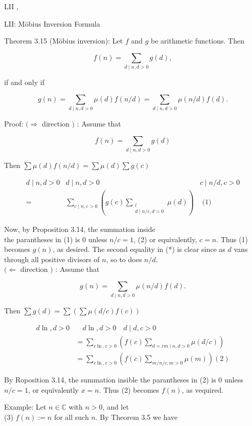 \documentclass[10pt]{article}
\begin{document}
LII ,

LII: Möbius Inversion Formula

Theorem 3.15 (Möbius inversion): Let $f$ and $g$ be arithmetic functions. Then

$$
f(n)=\sum_{d \mid n, d>0} g(d),
$$

if and only if

$$
g(n)=\sum_{d \mid n, d>0} \mu(d) f(n / d)=\sum_{d \mid n, d>0} \mu(n / d) f(d) .
$$

Proof: $(\Rightarrow$ direction $)$ : Assume that

$$
f(n)=\sum_{d \mid n, d>0} g(d)
$$

Then $\sum \mu(d) f(n / d)=\sum \mu(d) \sum g(c)$

\[
\begin{array}{lll}
d \mid n, d>0 & d \mid n, d>0 & c \mid n / d, c>0 \\
= & \sum_{c \mid n, c>0}\left(g(c) \sum_{\substack{l \\
d \mid n / c, d>0}} \mu(d)\right) & \text { (1) } \tag{1}
\end{array}
\]

Now, by Proposition 3.14, the summation inside\\
the parantheses in (1) is 0 unless $n / c=1$, (2) or equivalently, $c=n$. Thus (1) becomes $g(n)$, as desired. The second equality in (*) is clear since as $d$ vans through all positive divisors of $n$, so to does $n / d$.\\
$(\Leftarrow$ direction $)$ : Assume that

$$
g(n)=\sum_{d \mid n, d>0} \mu(n / d) f(d) .
$$

Then $\sum g(d)=\sum\left(\sum \mu(d / c) f(c)\right)$

$$
\begin{aligned}
d \ln , d>0 & \quad d \ln , d>0 \quad d \mid d, c>0 \\
& =\sum_{c \ln , c>0}\left(f(c) \sum_{d=c m \mid n, d>0} \mu(d / c)\right) \\
& =\sum_{c \ln , c>0}\left(f(c) \sum_{m / n / c, m>0} \mu(m)\right)(2)
\end{aligned}
$$

By Roposition 3.14, the summation insible the parantheses in (2) is 0 unless $n / c=1$, or equivalently $x=n$. Thus (2) becomes $f(n)$, as vequired.

Example: Let $n \in \mathbb{C}$ with $n>0$, and let\\
(3) $f(n):=n$ for all such $n$. By Theorem 3.5 we have
\end{document}
